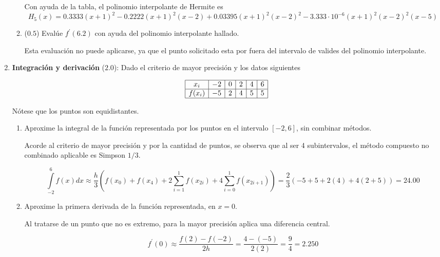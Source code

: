 \documentclass[12pt]{article}
\begin{document}
\begin{enumerate}[leftmargin=*,widest=9]
\begin{enumerate}[label=\alph*]
    Con ayuda de la tabla, el polinomio interpolante de Hermite es
    \[
    H_5(x) = 0.3333(x+1)^2 - 0.2222(x+1)^2(x-2) + 0.03395(x+1)^2(x-2)^2 - 3.333\cdot 10^{-6}(x+1)^2(x-2)^2(x-5)
    \]
    
    \item ($0.5$) Evalúe \(f^\prime(6.2)\) con ayuda del polinomio interpolante hallado.
    

Esta evaluación no puede aplicarse, ya que el punto solicitado esta por fuera del intervalo de valides del polinomio interpolante.
    
    \end{enumerate}
   
    \item \textbf{Integración y derivación} ($2.0$): Dado el criterio de mayor precisión y los datos siguientes
    
    \[
    \begin{array}{|c|c|c|c|c|c|}
    \hline
    x_i & -2 & 0 & 2 & 4 & 6 \\
    \hline
    f(x_i) & -5 & 2 & 4 & 5 & 5\\
    \hline
    \end{array}
    \]
    
    Nótese que los puntos son equidistantes.
    
    \begin{enumerate}[label=\alph*]

    \item  Aproxime la integral de la función representada por los puntos en el intervalo \(\left[-2, 6\right]\), sin combinar métodos.
    
    Acorde al criterio de mayor precisión y por la cantidad de puntos, se observa que al ser 4 subintervalos, el método compuesto no combinado aplicable es Simpson \(1/3\).
    
    \[
    \int\limits_{-2}^6 f(x)dx \approx \frac{h}{3}\left( f(x_0) + f(x_4) + 2\sum\limits_{i=1}^{1}f(x_{2i}) + 4\sum\limits_{i=0}^{1}f(x_{2i+1}) \right) = \frac{2}{3}(-5 + 5 + 2(4) + 4 ( 2 + 5)) = 24.00
    \]
    
    \item Aproxime la primera derivada de la función representada, en \(x = 0\).
    
    Al tratarse de un punto que no es extremo, para la mayor precisión aplica una diferencia central.
    
    \[
    f^\prime(0) \approx \frac{f(2) - f(-2)}{2h} = \frac{4-(-5)}{2(2)} = \frac{9}{4} = 2.250
    \]
    
    \end{enumerate}

    
  \end{enumerate}
  
\end{document}

